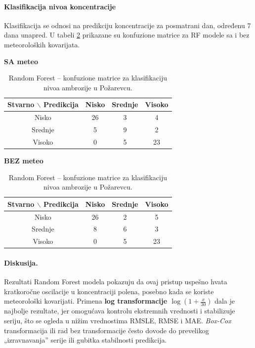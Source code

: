 \documentclass[12pt]{article}
\begin{document}
\paragraph{\textbf{Klasifikacija nivoa koncentracije}}  
Klasifikacija se odnosi na predikciju koncentracije za posmatrani dan, određenu 7 dana unapred.  
U tabeli \ref{tab:rf_cm} prikazane su konfuzione matrice za RF modele sa i bez meteoroloških kovarijata.
\begin{table}[H]
\centering
\caption{Random Forest – konfuzione matrice za klasifikaciju nivoa ambrozije u Požarevcu.}
\label{tab:rf_cm}
\renewcommand{\arraystretch}{1.3}
\begin{center}
\begin{minipage}{0.45\textwidth}
\centering
\textbf{SA meteo} \\[2mm]
\begin{tabular}{|c|c|c|c|}
\hline
\textbf{Stvarno $\backslash$ Predikcija} & \textbf{Nisko} & \textbf{Srednje} & \textbf{Visoko} \\ \hline
Nisko   & 26 & 3 & 4 \\ \hline
Srednje & 5  & 9 & 2 \\ \hline
Visoko  & 0  & 5 & 23 \\ \hline
\end{tabular}
\end{minipage}
\hfill
\begin{minipage}{0.45\textwidth}
\centering
\textbf{BEZ meteo} \\[2mm]
\begin{tabular}{|c|c|c|c|}
\hline
\textbf{Stvarno $\backslash$ Predikcija} & \textbf{Nisko} & \textbf{Srednje} & \textbf{Visoko} \\ \hline
Nisko   & 26 & 2 & 5 \\ \hline
Srednje & 8  & 6 & 3 \\ \hline
Visoko  & 0  & 5 & 23 \\ \hline
\end{tabular}
\end{minipage}
\end{center}
\end{table}

\paragraph{\textbf{Diskusija.}}  
Rezultati Random Forest modela pokazuju da ovaj pristup uspešno hvata kratkoročne oscilacije u koncentraciji polena, posebno kada se koriste meteorološki kovarijati.
Primena \textbf{log transformacije $\log(1 + \tfrac{x}{30})$} dala je najbolje rezultate, jer omogućava kontrolu ekstremnih vrednosti i stabilizuje seriju, što se ogleda u nižim vrednostima RMSLE, RMSE i MAE. \textit{Box-Cox} transformacija ili rad bez transformacije često dovode do prevelikog „izravnavanja” serije ili gubitka stabilnosti predikcija.
\end{document}
